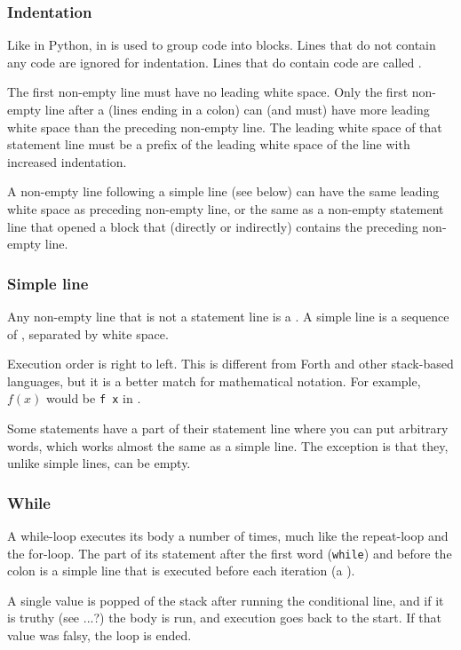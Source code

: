 \subsubsection{Indentation}

Like in Python, in \dv{}  is used to group code into
blocks. Lines that do not contain any code are ignored for indentation.
Lines that do contain code are called .

The first non-empty line must have no leading white space. Only the first
non-empty line after a  (lines ending in a colon)
can (and must) have more leading white space than the preceding non-empty
line. The leading white space of that statement line must be a prefix of
the leading white space of the line with increased indentation.

A non-empty line following a simple line (see below) can
have the same leading white space as preceding non-empty line, or the same as
a non-empty statement line that opened a block that (directly or indirectly)
contains the preceding non-empty line.

\subsubsection{Simple line}

Any non-empty line that is not a statement line is a .
A simple line is a sequence of , separated by white space.

Execution order is right to left. This is different from Forth and other
stack-based languages, but it is a better match for mathematical
notation. For example, $f(x)$ would be \verb!f x! in \dv{}.

Some statements have a part of their statement line where you can put arbitrary
words, which works almost the same as a simple line. The exception is that they,
unlike simple lines, can be empty.

\subsubsection{While}

A while-loop executes its body a number of times, much like the repeat-loop and
the for-loop. The part of its statement after the first word (\verb!while!) and
before the colon is a simple line that is executed before each iteration (a
).

A single value is popped of the stack after running the conditional line, and
if it is truthy (see ...?) the body is run, and execution goes back to the
start. If that value was falsy, the loop is ended.

